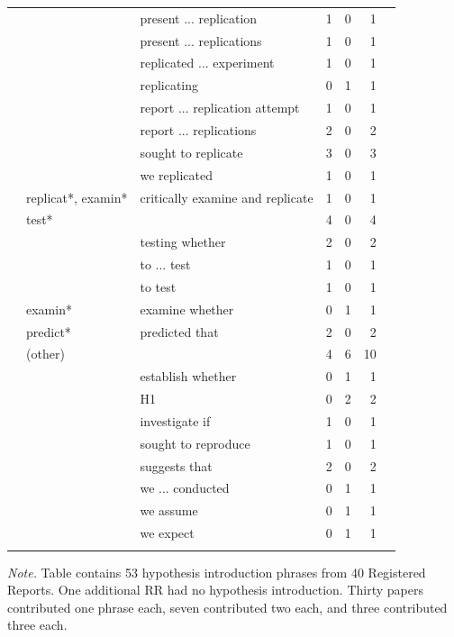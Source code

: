 \documentclass[british,,man,floatsintext]{apa6}
\begin{document}
\begin{table}[tbp]
\begin{center}
\begin{threeparttable}
{\begin{tabular}{lllrrrr}
 &  & present ... replication & 1 & 0 & 1 & \\
 &  & present ... replications & 1 & 0 & 1 & \\
 &  & replicated ... experiment & 1 & 0 & 1 & \\
 &  & replicating & 0 & 1 & 1 & \\
 &  & report ... replication attempt & 1 & 0 & 1 & \\
 &  & report ... replications & 2 & 0 & 2 & \\
 &  & sought to replicate & 3 & 0 & 3 & \\
 &  & we replicated & 1 & 0 & 1 & \\ \midrule
 & replicat*, examin* & critically examine and replicate & 1 & 0 & 1 & \\ \midrule
 & test* &  & 4 & 0 & 4 & \\
 &  & testing whether & 2 & 0 & 2 & \\
 &  & to ... test & 1 & 0 & 1 & \\
 &  & to test & 1 & 0 & 1 & \\ \midrule
 & examin* & examine whether & 0 & 1 & 1 & \\ \midrule
 & predict* & predicted that & 2 & 0 & 2 & \\ \midrule
 & (other) &  & 4 & 6 & 10 & \\
 &  & establish whether & 0 & 1 & 1 & \\
 &  & H1 & 0 & 2 & 2 & \\
 &  & investigate if & 1 & 0 & 1 & \\
 &  & sought to reproduce & 1 & 0 & 1 & \\
 &  & suggests that & 2 & 0 & 2 & \\
 &  & we ... conducted & 0 & 1 & 1 & \\
 &  & we assume & 0 & 1 & 1 & \\
 &  & we expect & 0 & 1 & 1 & \\
\bottomrule
\addlinespace
\end{tabular}

}

\begin{tablenotes}[para]
\normalsize{\textit{Note.} Table contains 53 hypothesis introduction phrases from 40 Registered Reports. One additional RR had no hypothesis introduction. Thirty papers contributed one phrase each, seven contributed two each, and three contributed three each.}
\end{tablenotes}

\end{threeparttable}
\end{center}

\end{table}
\end{document}
